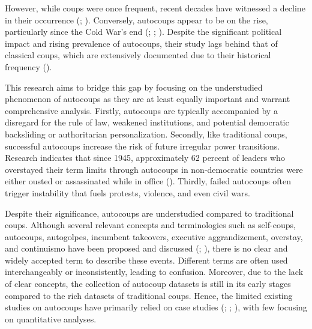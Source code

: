 \documentclass[
  12pt,
]{report}
\begin{document}
However, while coups were once frequent, recent decades have witnessed a
decline in their occurrence (;
). Conversely, autocoups
appear to be on the rise, particularly since the Cold War's end
(;
;
). Despite the
significant political impact and rising prevalence of autocoups, their
study lags behind that of classical coups, which are extensively
documented due to their historical frequency
().

This research aims to bridge this gap by focusing on the understudied
phenomenon of autocoups as they are at least equally important and
warrant comprehensive analysis. Firstly, autocoups are typically
accompanied by a disregard for the rule of law, weakened institutions,
and potential democratic backsliding or authoritarian personalization.
Secondly, like traditional coups, successful autocoups increase the risk
of future irregular power transitions. Research indicates that since
1945, approximately 62 percent of leaders who overstayed their term
limits through autocoups in non-democratic countries were either ousted
or assassinated while in office (). Thirdly, failed autocoups often trigger instability that fuels
protests, violence, and even civil wars.

Despite their significance, autocoups are understudied compared to
traditional coups. Although several relevant concepts and terminologies
such as self-coups, autocoups, autogolpes, incumbent takeovers,
executive aggrandizement, overstay, and continuismo have been proposed
and discussed (; ),
there is no clear and widely accepted term to describe these events.
Different terms are often used interchangeably or inconsistently,
leading to confusion. Moreover, due to the lack of clear concepts, the
collection of autocoup datasets is still in its early stages compared to
the rich datasets of traditional coups. Hence, the limited existing
studies on autocoups have primarily relied on case studies
(;
;
),
with few focusing on quantitative analyses.
\end{document}
